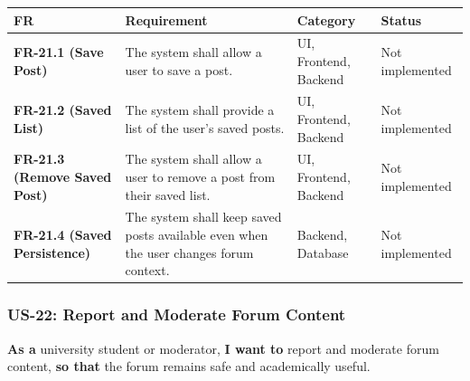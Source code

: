 \documentclass[12pt]{article}
\renewcommand{\baselinestretch}{1.5}
\begin{document}
\begingroup
\small
\renewcommand{\baselinestretch}{1.0}\selectfont
\renewcommand{\arraystretch}{1.15}
\setlength{\tabcolsep}{6pt}
\begin{longtable}{|>{\raggedright\arraybackslash}p{}|>{\raggedright\arraybackslash}p{}|>{\raggedright\arraybackslash}p{}|>{\raggedright\arraybackslash}p{}|}
\hline
\textbf{FR} & \textbf{Requirement} & \textbf{Category} & \textbf{Status} \\ \hline
\endhead
\textbf{FR-21.1 (Save Post)} & The system shall allow a user to save a post. & UI, Frontend, Backend & Not implemented \\ \hline
\textbf{FR-21.2 (Saved List)} & The system shall provide a list of the user's saved posts. & UI, Frontend, Backend & Not implemented \\ \hline
\textbf{FR-21.3 (Remove Saved Post)} & The system shall allow a user to remove a post from their saved list. & UI, Frontend, Backend & Not implemented \\ \hline
\textbf{FR-21.4 (Saved Persistence)} & The system shall keep saved posts available even when the user changes forum context. & Backend, Database & Not implemented \\ \hline
\end{longtable}
\endgroup
\par\medskip

\hypertarget{sec:us-22-report-and-moderate-forum-content}{}
\subsubsection*{US-22: Report and Moderate Forum Content}
\par\medskip

\textbf{As a} university student or moderator, \textbf{I want to} report and moderate forum content, \textbf{so that} the forum remains safe and academically useful.
\par\medskip
\end{document}
